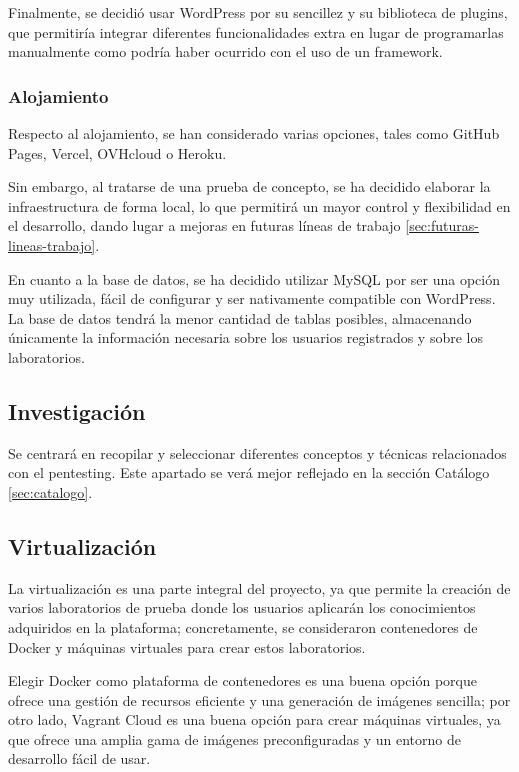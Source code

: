             Finalmente, se decidió usar WordPress por su sencillez y su biblioteca de plugins, que permitiría integrar diferentes funcionalidades extra en lugar de programarlas manualmente como podría haber ocurrido con el uso de un framework.
                
            \subsubsection{Alojamiento}
            
                Respecto al alojamiento, se han considerado varias opciones, tales como GitHub Pages, Vercel, OVHcloud o Heroku.
                
                Sin embargo, al tratarse de una prueba de concepto, se ha decidido elaborar la infraestructura de forma local, lo que permitirá un mayor control y flexibilidad en el desarrollo, dando lugar a mejoras en futuras líneas de trabajo \ref{sec:futuras-lineas-trabajo}.

                En cuanto a la base de datos, se ha decidido utilizar MySQL por ser una opción muy utilizada, fácil de configurar y ser nativamente compatible con WordPress. La base de datos tendrá la menor cantidad de tablas posibles, almacenando únicamente la información necesaria sobre los usuarios registrados y sobre los laboratorios.
            
        \subsection{Investigación}
        
            Se centrará en recopilar y seleccionar diferentes conceptos y técnicas relacionados con el pentesting. Este apartado se verá mejor reflejado en la sección Catálogo \ref{sec:catalogo}.
        
        \subsection{Virtualización}

            La virtualización es una parte integral del proyecto, ya que permite la creación de varios laboratorios de prueba donde los usuarios aplicarán los conocimientos adquiridos en la plataforma; concretamente, se consideraron contenedores de Docker y máquinas virtuales para crear estos laboratorios.
            
            Elegir Docker como plataforma de contenedores es una buena opción porque ofrece una gestión de recursos eficiente y una generación de imágenes sencilla; por otro lado, Vagrant Cloud es una buena opción para crear máquinas virtuales, ya que ofrece una amplia gama de imágenes preconfiguradas y un entorno de desarrollo fácil de usar.
            
